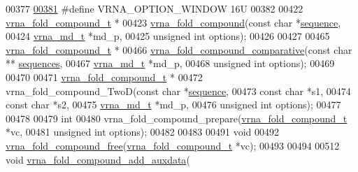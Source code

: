 \begin{DoxyCode}
00377 
\hyperlink{group__fold__compound_ga2b2a8009ccdccc3eb1571556261aee8e}{00381} \textcolor{preprocessor}{#define VRNA\_OPTION\_WINDOW          16U}
00382 
00422 \hyperlink{group__fold__compound_structvrna__fc__s}{vrna\_fold\_compound\_t} *
00423 \hyperlink{group__fold__compound_ga6601d994ba32b11511b36f68b08403be}{vrna\_fold\_compound}(\textcolor{keyword}{const} \textcolor{keywordtype}{char}   *\hyperlink{group__fold__compound_a87f6abcda89cfb7a486c97e1f5371525}{sequence},
00424                    \hyperlink{group__model__details_structvrna__md__s}{vrna\_md\_t}    *md\_p,
00425                    \textcolor{keywordtype}{unsigned} \textcolor{keywordtype}{int} options);
00426 
00427 
00465 \hyperlink{group__fold__compound_structvrna__fc__s}{vrna\_fold\_compound\_t} *
00466 \hyperlink{group__fold__compound_gad6bacc816af274922b13d947f708aa0c}{vrna\_fold\_compound\_comparative}(\textcolor{keyword}{const} \textcolor{keywordtype}{char}   **
      \hyperlink{group__fold__compound_a965dbb42f2e13cace5aa3bbab4396530}{sequences},
00467                                \hyperlink{group__model__details_structvrna__md__s}{vrna\_md\_t}    *md\_p,
00468                                \textcolor{keywordtype}{unsigned} \textcolor{keywordtype}{int} options);
00469 
00470 
00471 \hyperlink{group__fold__compound_structvrna__fc__s}{vrna\_fold\_compound\_t} *
00472 vrna\_fold\_compound\_TwoD(\textcolor{keyword}{const} \textcolor{keywordtype}{char}    *\hyperlink{group__fold__compound_a87f6abcda89cfb7a486c97e1f5371525}{sequence},
00473                         \textcolor{keyword}{const} \textcolor{keywordtype}{char}    *s1,
00474                         \textcolor{keyword}{const} \textcolor{keywordtype}{char}    *s2,
00475                         \hyperlink{group__model__details_structvrna__md__s}{vrna\_md\_t}     *md\_p,
00476                         \textcolor{keywordtype}{unsigned} \textcolor{keywordtype}{int}  options);
00477 
00478 
00479 \textcolor{keywordtype}{int}
00480 vrna\_fold\_compound\_prepare(\hyperlink{group__fold__compound_structvrna__fc__s}{vrna\_fold\_compound\_t} *vc,
00481                            \textcolor{keywordtype}{unsigned} \textcolor{keywordtype}{int}         options);
00482 
00483 
00491 \textcolor{keywordtype}{void}
00492 \hyperlink{group__fold__compound_gadded6039d63f5d6509836e20321534ad}{vrna\_fold\_compound\_free}(\hyperlink{group__fold__compound_structvrna__fc__s}{vrna\_fold\_compound\_t} *vc);
00493 
00494 
00512 \textcolor{keywordtype}{void} \hyperlink{group__fold__compound_ga6316a9426bea2f742375e8df6febd3f6}{vrna\_fold\_compound\_add\_auxdata}(

\end{DoxyCode}
